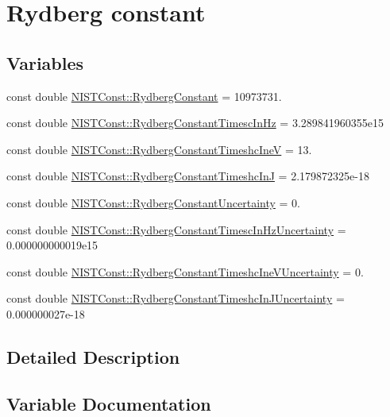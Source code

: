 \hypertarget{group___rydberg_constant}{}\section{Rydberg constant}
\label{group___rydberg_constant}
\subsection*{Variables}
\begin{DoxyCompactItemize}
\item 
const double \hyperlink{group___rydberg_constant_gaa434f78f9fead2fcf2e129a137853e26}{N\+I\+S\+T\+Const\+::\+Rydberg\+Constant} = 10973731.
\item 
const double \hyperlink{group___rydberg_constant_ga473e14f2663eccecd987928be1d512ad}{N\+I\+S\+T\+Const\+::\+Rydberg\+Constant\+Timesc\+In\+Hz} = 3.\+289841960355e15
\item 
const double \hyperlink{group___rydberg_constant_ga77c7dd314342e7f121d9b8775a45d20f}{N\+I\+S\+T\+Const\+::\+Rydberg\+Constant\+Timeshc\+IneV} = 13.
\item 
const double \hyperlink{group___rydberg_constant_gaa4164006d51dbf240eb83065e83bddec}{N\+I\+S\+T\+Const\+::\+Rydberg\+Constant\+Timeshc\+InJ} = 2.\+179872325e-\/18
\item 
const double \hyperlink{group___rydberg_constant_ga694e342f62e81330dcc1b1469acc945c}{N\+I\+S\+T\+Const\+::\+Rydberg\+Constant\+Uncertainty} = 0.
\item 
const double \hyperlink{group___rydberg_constant_ga02443a9398e1e1a60ee2e9271f814964}{N\+I\+S\+T\+Const\+::\+Rydberg\+Constant\+Timesc\+In\+Hz\+Uncertainty} = 0.\+000000000019e15
\item 
const double \hyperlink{group___rydberg_constant_gab03fbc3395eeac5538a651a8ee29f2b2}{N\+I\+S\+T\+Const\+::\+Rydberg\+Constant\+Timeshc\+Ine\+V\+Uncertainty} = 0.
\item 
const double \hyperlink{group___rydberg_constant_ga448546d3ffdb4f72ddd2ab15d5e9e470}{N\+I\+S\+T\+Const\+::\+Rydberg\+Constant\+Timeshc\+In\+J\+Uncertainty} = 0.\+000000027e-\/18
\end{DoxyCompactItemize}


\subsection{Detailed Description}


\subsection{Variable Documentation}
\mbox{\label{group___rydberg_constant_gaa434f78f9fead2fcf2e129a137853e26}} 
